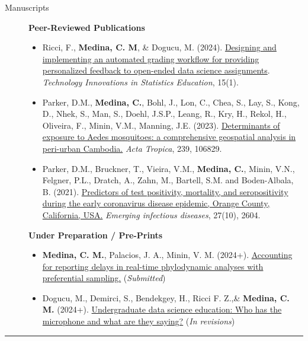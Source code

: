 \documentclass{article}
\begin{document}
	
	\begin{description}
		\vspace{-2mm}
		
		\item[Manuscripts] \hspace*{.1in} 
		
		\textbf{Peer-Reviewed Publications}
		\begin{itemize}
			\item Ricci, F., \textbf{Medina, C. M}, \& Dogucu, M. (2024). \href{https://doi.org/10.5070/T5.1886}{Designing and implementing an automated grading workflow for providing personalized feedback to open-ended data science assignments}. \textit{Technology Innovations in Statistics Education}, 15(1).
			
			\item Parker, D.M., \textbf{Medina, C.}, Bohl, J., Lon, C., Chea, S., Lay, S., Kong, D., Nhek, S., Man, S., Doehl, J.S.P., Leang, R., Kry, H., Rekol, H., Oliveira, F., Minin, V.M., Manning, J.E. (2023). \href{https://doi.org/10.1016/j.actatropica.2023.106829}{Determinants of exposure to Aedes mosquitoes: a comprehensive geospatial analysis in peri-urban Cambodia.} \textit{Acta Tropica}, 239, 106829. 
			
			\item Parker, D.M., Bruckner, T., Vieira, V.M., \textbf{Medina, C.}, Minin, V.N., Felgner, P.L., Dratch, A., Zahn, M., Bartell, S.M. and Boden-Albala, B. (2021). \href{https://doi.org/10.3201/eid2710.210103}{Predictors of test positivity, mortality, and seropositivity during the early coronavirus disease epidemic, Orange County, California, USA.} \textit{Emerging infectious diseases}, 27(10), 2604.
		\end{itemize}	
		
		\textbf{Under Preparation / Pre-Prints}
		\begin{itemize}
			\item \textbf{Medina, C. M.}, Palacios, J. A., Minin, V. M. (2024+). \href{https://arxiv.org/abs/2407.18432}{Accounting for reporting delays in real-time phylodynamic analyses with preferential sampling.} (\textit{Submitted})
			
			\item Dogucu, M., Demirci, S., Bendekgey, H., Ricci F. Z.,\& \textbf{Medina, C. M.} (2024+). \href{https://doi.org/10.48550/arXiv.2403.03387}{Undergraduate data science education: Who has the microphone and what are they saying?} (\textit{In revisions})
		\end{itemize}
		
	\end{description}
	\vspace{-2mm}
	\rule{\linewidth}{1pt}
	
\end{document}
